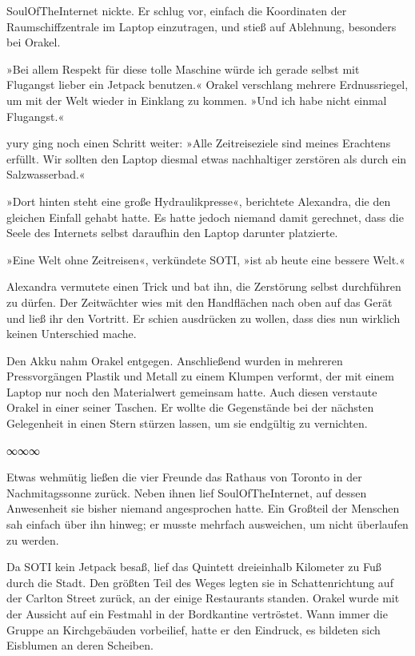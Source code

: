 SoulOfTheInternet nickte. Er schlug vor, einfach die Koordinaten der Raumschiffzentrale im Laptop einzutragen, und stieß auf Ablehnung, besonders bei Orakel.

»Bei allem Respekt für diese tolle Maschine würde ich gerade selbst mit Flugangst lieber ein Jetpack benutzen.« Orakel verschlang mehrere Erdnussriegel, um mit der Welt wieder in Einklang zu kommen. »Und ich habe nicht einmal Flugangst.«

yury ging noch einen Schritt weiter: »Alle Zeitreiseziele sind meines Erachtens erfüllt. Wir sollten den Laptop diesmal etwas nachhaltiger zerstören als durch ein Salzwasserbad.«

»Dort hinten steht eine große Hydraulikpresse«, berichtete Alexandra, die den gleichen Einfall gehabt hatte. Es hatte jedoch niemand damit gerechnet, dass die Seele des Internets selbst daraufhin den Laptop darunter platzierte.

»Eine Welt ohne Zeitreisen«, verkündete SOTI, »ist ab heute eine bessere Welt.«

Alexandra vermutete einen Trick und bat ihn, die Zerstörung selbst durchführen zu dürfen. Der Zeitwächter wies mit den Handflächen nach oben auf das Gerät und ließ ihr den Vortritt. Er schien ausdrücken zu wollen, dass dies nun wirklich keinen Unterschied mache.

Den Akku nahm Orakel entgegen. Anschließend wurden in mehreren Pressvorgängen Plastik und Metall zu einem Klumpen verformt, der mit einem Laptop nur noch den Materialwert gemeinsam hatte. Auch diesen verstaute Orakel in einer seiner Taschen. Er wollte die Gegenstände bei der nächsten Gelegenheit in einen Stern stürzen lassen, um sie endgültig zu vernichten.

\begin{center}
∞∞∞
\end{center}

Etwas wehmütig ließen die vier Freunde das Rathaus von Toronto in der Nachmitagssonne zurück. Neben ihnen lief SoulOfTheInternet, auf dessen Anwesenheit sie bisher niemand angesprochen hatte. Ein Großteil der Menschen sah einfach über ihn hinweg; er musste mehrfach ausweichen, um nicht überlaufen zu werden.

Da SOTI kein Jetpack besaß, lief das Quintett dreieinhalb Kilometer zu Fuß durch die Stadt. Den größten Teil des Weges legten sie in Schattenrichtung auf der Carlton Street zurück, an der einige Restaurants standen. Orakel wurde mit der Aussicht auf ein Festmahl in der Bordkantine vertröstet. Wann immer die Gruppe an Kirchgebäuden vorbeilief, hatte er den Eindruck, es bildeten sich Eisblumen an deren Scheiben.

